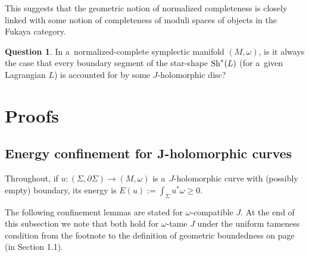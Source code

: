 \documentclass[pdftex]{sigma}
\numberwithin{equation}{section}
\theoremstyle{definition}
\newtheorem{ques}[Theorem]{Question}
\begin{document}
This suggests that the geometric notion of normalized completeness is closely linked with some notion of completeness of moduli spaces of objects in the Fukaya category.
\begin{ques}\label{ques:fukaya-boundary}
In a~normalized-complete symplectic manifold $(M,\omega)$, is it always the case that every boundary segment of the star-shape ${\rm Sh}^*(L)$ (for a~given Lagrangian $L$) is accounted for by some $J$-holomorphic disc?
\end{ques}

\section{Proofs}\label{sec:proofs}

\subsection[Energy confinement for J-holomorphic curves]{Energy confinement for $\boldsymbol{J}$-holomorphic curves}
Throughout, if $u\colon (\Sigma,\partial\Sigma)\to (M,\omega)$ is a~$J$-holomorphic curve with (possibly empty) boundary, its energy is
$
E(u):=\int_{\Sigma} u^{*}\omega \ge 0$.


The following confinement lemmas are stated for $\omega$-compatible $J$. At the end of this subsection we note that both hold for $\omega$-tame $J$ under the uniform tameness condition from the footnote to the definition of geometric boundedness on page \pageref{tm:1} (in Section 1.1).
\end{document}
